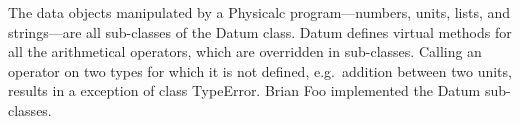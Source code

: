 The data objects manipulated by a Physicalc program---numbers, units,
lists, and strings---are all sub-classes of the Datum class.  Datum
defines virtual methods for all the arithmetical operators, which are
overridden in sub-classes.  Calling an operator on two types for which
it is not defined, e.g.\ addition between two units, results in a
exception of class TypeError.  Brian Foo implemented the Datum
sub-classes.
